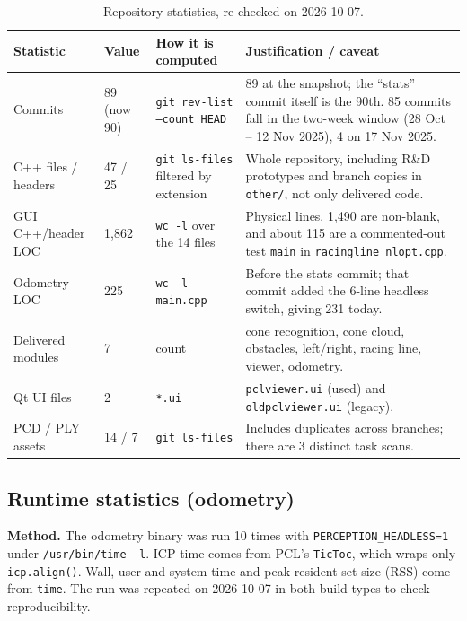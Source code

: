 \documentclass[10pt,a4paper]{scrartcl}
\renewcommand{\emph}[1]{\textcolor{accent}{#1}}
\newcommand{\code}[1]{\texttt{#1}}
\newcommand{\file}[1]{\texttt{\small #1}}
\begin{document}
  \begin{table}[H]
  \small
  \centering
  \renewcommand{\arraystretch}{1.1}
  \begin{tabularx}{\textwidth}{@{}L{3.6cm} L{1.6cm} L{4.6cm} X@{}}
  \toprule
  \textbf{Statistic} & \textbf{Value} & \textbf{How it is computed} & \textbf{Justification / caveat} \\
  \midrule
  Commits & 89 (now 90) & \code{git rev-list --count HEAD} & 89 at the snapshot; the ``stats'' commit itself is the 90th. 85 commits fall in the two-week window (28 Oct -- 12 Nov 2025), 4 on 17 Nov 2025. \\[.1cm]
  C++ files / headers & 47 / 25 & \code{git ls-files} filtered by extension & Whole repository, including R\&D prototypes and branch copies in \file{other/}, not only delivered code. \\[.1cm]
  GUI C++/header LOC & 1,862 & \code{wc -l} over the 14 files & Physical lines. 1,490 are non-blank, and about 115 are a commented-out test \code{main} in \file{racingline\_nlopt.cpp}. \\[.1cm]
  Odometry LOC & 225 & \code{wc -l main.cpp} & Before the stats commit; that commit added the 6-line headless switch, giving 231 today. \\[.1cm]
  Delivered modules & 7 & count & cone recognition, cone cloud, obstacles, left/right, racing line, viewer, odometry. \\[.1cm]
  Qt UI files & 2 & \code{*.ui} & \file{pclviewer.ui} (used) and \file{oldpclviewer.ui} (legacy). \\[.1cm]
  PCD / PLY assets & 14 / 7 & \code{git ls-files} & Includes duplicates across branches; there are 3 distinct task scans. \\
  \bottomrule
  \end{tabularx}
  \caption{Repository statistics, re-checked on 2026-10-07.}
  \label{tab:repostats}
  \end{table}

  \subsection{Runtime statistics (odometry)}

  \textbf{Method.} The odometry binary was run 10 times with
  \code{PERCEPTION\_HEADLESS=1} under \code{/usr/bin/time -l}. ICP time comes from PCL's
  \code{TicToc}, which wraps \emph{only} \code{icp.align()}. Wall, user and system time
  and peak resident set size (RSS) come from \code{time}. The run was repeated on
  2026-10-07 in both build types to check reproducibility.
\end{document}
